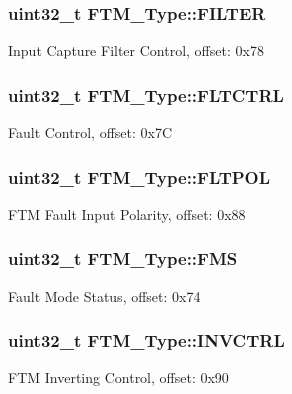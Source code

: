\subsubsection[{\texorpdfstring{F\+I\+L\+T\+ER}{FILTER}}]{ uint32\+\_\+t F\+T\+M\+\_\+\+Type\+::\+F\+I\+L\+T\+ER}\hypertarget{structFTM__Type_a15a781ea3e00391d0723b3bf3d13444f}{}\label{structFTM__Type_a15a781ea3e00391d0723b3bf3d13444f}
Input Capture Filter Control, offset\+: 0x78 
\subsubsection[{\texorpdfstring{F\+L\+T\+C\+T\+RL}{FLTCTRL}}]{ uint32\+\_\+t F\+T\+M\+\_\+\+Type\+::\+F\+L\+T\+C\+T\+RL}\hypertarget{structFTM__Type_ac3f55a671f3ec1b0024d894ea9a86f01}{}\label{structFTM__Type_ac3f55a671f3ec1b0024d894ea9a86f01}
Fault Control, offset\+: 0x7C 
\subsubsection[{\texorpdfstring{F\+L\+T\+P\+OL}{FLTPOL}}]{ uint32\+\_\+t F\+T\+M\+\_\+\+Type\+::\+F\+L\+T\+P\+OL}\hypertarget{structFTM__Type_af3bab26c41de8b03fd2d925abdc3eaea}{}\label{structFTM__Type_af3bab26c41de8b03fd2d925abdc3eaea}
F\+TM Fault Input Polarity, offset\+: 0x88 
\subsubsection[{\texorpdfstring{F\+MS}{FMS}}]{ uint32\+\_\+t F\+T\+M\+\_\+\+Type\+::\+F\+MS}\hypertarget{structFTM__Type_adba577540e3be5b0e96ba5bc7538eac2}{}\label{structFTM__Type_adba577540e3be5b0e96ba5bc7538eac2}
Fault Mode Status, offset\+: 0x74 
\subsubsection[{\texorpdfstring{I\+N\+V\+C\+T\+RL}{INVCTRL}}]{ uint32\+\_\+t F\+T\+M\+\_\+\+Type\+::\+I\+N\+V\+C\+T\+RL}\hypertarget{structFTM__Type_a5d7825cc57a84230359220fa95b990d0}{}\label{structFTM__Type_a5d7825cc57a84230359220fa95b990d0}
F\+TM Inverting Control, offset\+: 0x90 

